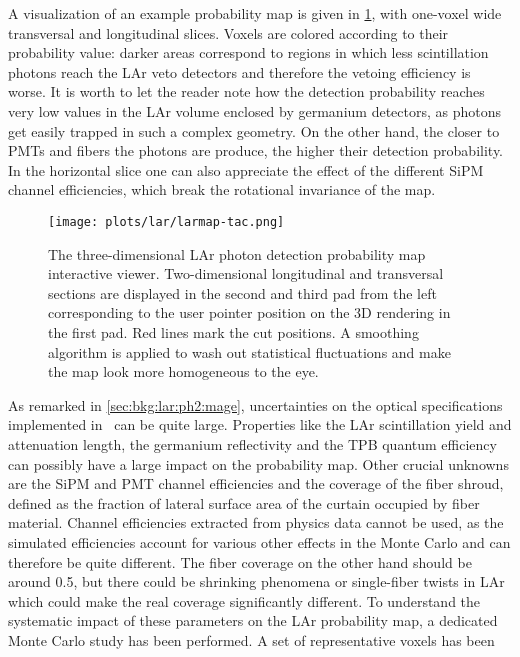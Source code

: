 A visualization of an example probability map is given in
\cref{fig:bkg:lar:ph2:larmap:tac}, with one-voxel wide transversal and longitudinal
slices. Voxels are colored according to their probability value: darker areas correspond
to regions in which less scintillation photons reach the LAr veto detectors and therefore
the vetoing efficiency is worse. It is worth to let the reader note how the detection
probability reaches very low values in the LAr volume enclosed by germanium detectors, as
photons get easily trapped in such a complex geometry. On the other hand, the closer to
PMTs and fibers the photons are produce, the higher their detection probability. In the
horizontal slice one can also appreciate the effect of the different SiPM channel
efficiencies, which break the rotational invariance of the map.
\begin{figure}
  \centering
  \texttt{[image: plots/lar/larmap-tac.png]}
  \caption{%
    The three-dimensional LAr photon detection probability map interactive viewer.
    Two-dimensional longitudinal and transversal sections are displayed in the second and
    third pad from the left corresponding to the user pointer position on the 3D
    rendering in the first pad. Red lines mark the cut positions. A smoothing algorithm is
    applied to wash out statistical fluctuations and make the map look more homogeneous to
    the eye.
  }\label{fig:bkg:lar:ph2:larmap:tac}
\end{figure}
\newpar
As remarked in \cref{sec:bkg:lar:ph2:mage}, uncertainties on the optical specifications
implemented in \mage\ can be quite large. Properties like the LAr scintillation yield and
attenuation length, the germanium reflectivity and the TPB quantum efficiency can possibly
have a large impact on the probability map. Other crucial unknowns are the SiPM and PMT
channel efficiencies and the coverage of the fiber shroud, defined as the fraction of
lateral surface area of the curtain occupied by fiber material. Channel efficiencies
extracted from physics data cannot be used, as the simulated efficiencies account for
various other effects in the Monte Carlo and can therefore be quite different. The fiber
coverage on the other hand should be around 0.5, but there could be shrinking phenomena or
single-fiber twists in LAr which could make the real coverage significantly different.
\newpar
To understand the systematic impact of these parameters on the LAr probability map, a
dedicated Monte Carlo study has been performed. A set of representative voxels has been
